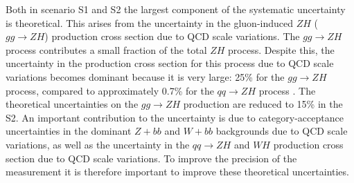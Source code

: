 \begin{table}[th!]
\begin{center}
{\vspace{5mm}
} %
\end{center}
\end{table}

Both in scenario S1 and S2 the largest component of the systematic uncertainty is theoretical. This arises from the uncertainty in the gluon-induced $ZH$ ($gg\to ZH$) production cross section due to QCD scale variations. The $gg\to ZH$ process contributes a small fraction of the total $ZH$ process. Despite this, the uncertainty in the production cross section for this process due to QCD scale variations  becomes dominant because it is very large: 25\% for the $gg\to ZH$ process, compared to approximately 0.7\% for the $qq\to ZH$ process \cite{deFlorian:2016spz}. The theoretical uncertainties on the $gg\to ZH$ production are reduced to 15\% in the S2.
An important contribution to the uncertainty is due to category-acceptance uncertainties in the dominant $Z+bb$ and $W+bb$ backgrounds due to QCD scale variations, as well as the uncertainty in the $qq\to ZH$ and $WH$ production
cross section due to QCD scale variations. 
To improve the precision of the measurement it is therefore important to improve these theoretical uncertainties.


